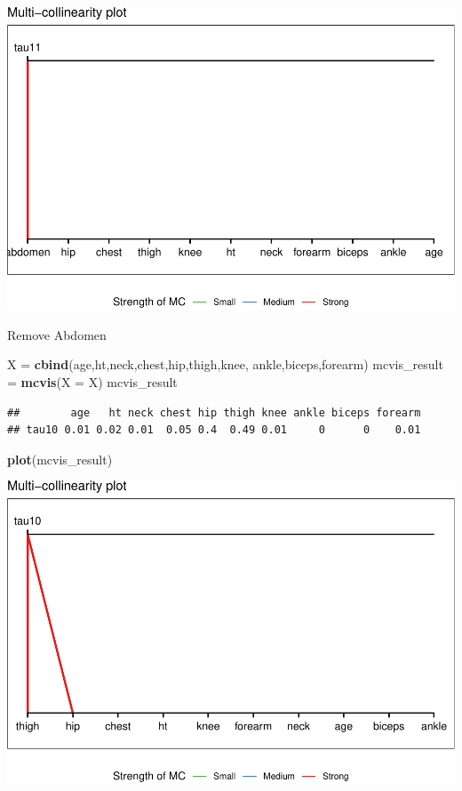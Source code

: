 \documentclass[]{article}
\newenvironment{Shaded}{\begin{snugshade}}{\end{snugshade}}
\newcommand{\KeywordTok}[1]{\textcolor[rgb]{0.13,0.29,0.53}{\textbf{#1}}}
\newcommand{\DataTypeTok}[1]{\textcolor[rgb]{0.13,0.29,0.53}{#1}}
\newcommand{\StringTok}[1]{\textcolor[rgb]{0.31,0.60,0.02}{#1}}
\newcommand{\NormalTok}[1]{#1}
\begin{document}
\includegraphics{BodyFat_files/figure-latex/unnamed-chunk-47-1.pdf}

Remove Abdomen

\begin{Shaded}
\begin{Highlighting}[]
\NormalTok{X =}\StringTok{ }\KeywordTok{cbind}\NormalTok{(age,ht,neck,chest,hip,thigh,knee,}
\NormalTok{         ankle,biceps,forearm)}
\NormalTok{mcvis_result =}\StringTok{ }\KeywordTok{mcvis}\NormalTok{(}\DataTypeTok{X =}\NormalTok{ X)}
\NormalTok{mcvis_result}
\end{Highlighting}
\end{Shaded}

\begin{verbatim}
##        age   ht neck chest hip thigh knee ankle biceps forearm
## tau10 0.01 0.02 0.01  0.05 0.4  0.49 0.01     0      0    0.01
\end{verbatim}

\begin{Shaded}
\begin{Highlighting}[]
\KeywordTok{plot}\NormalTok{(mcvis_result)}
\end{Highlighting}
\end{Shaded}

\includegraphics{BodyFat_files/figure-latex/unnamed-chunk-49-1.pdf}
\end{document}
